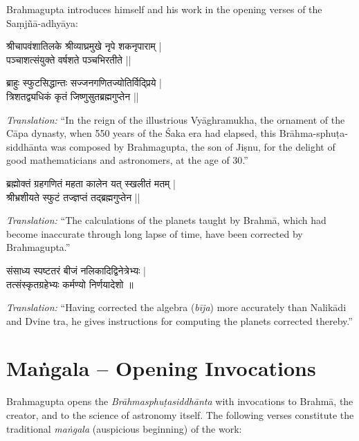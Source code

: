 \documentclass[11pt,a4paper]{article}
\newcommand{\shloka}[1]{{\devanagarifont\setlength{\leftskip}{2em}#1\par\medskip}}
\begin{document}
Brahmagupta introduces himself and his work in the opening verses of the Saṃjñā-adhyāya:

\shloka{%
श्रीचापवंशातिलके श्रीव्याघ्रमुखे नृपे शकनृपाराम् |\\
पञ्चाशत्संयुक्ते वर्षशते पञ्चभिरतीते ||
}

\shloka{%
ब्राहुः स्फुटसिद्धान्तः सज्जनगणितज्योतिर्विद्प्रिये |\\
त्रिशतद्व्यधिकं कृतं जिष्णुसुतब्रह्मगुप्तेन ||
}

\textit{Translation:} ``In the reign of the illustrious Vy\=aghramukha, the ornament of the C\=apa dynasty, when 550 years of the \'Saka era had elapsed, this Br\=ahma-sphu\d ta-siddh\=anta was composed by Brahmagupta, the son of Ji\d snu, for the delight of good mathematicians and astronomers, at the age of 30.''

\shloka{%
ब्रह्मोक्तं ग्रहगणितं महता कालेन यत् स्खलीतं मतम् |\\
श्रीभ्रशीयते स्फुटं तज्ज्ञप्तं तद्ब्रह्मगुप्तेन ||
}

\textit{Translation:} ``The calculations of the planets taught by Brahm\=a, which had become inaccurate through long lapse of time, have been corrected by Brahmagupta.''

\shloka{%
संसाध्य स्पष्टतरं बीजं नलिकादिद्विनेत्रेभ्यः |\\
तत्संस्कृतग्रहेभ्यः कर्मण्यो निर्णयादेशो ॥
}

\textit{Translation:} ``Having corrected the algebra (\textit{b\=ija}) more accurately than Nalik\=adi and Dvine tra, he gives instructions for computing the planets corrected thereby.''

\clearpage

\section*{Maṅgala -- Opening Invocations}

Brahmagupta opens the \textit{Brāhmasphuṭasiddhānta} with invocations to Brahmā, the creator, and to the science of astronomy itself. The following verses constitute the traditional \textit{maṅgala} (auspicious beginning) of the work:
\end{document}
